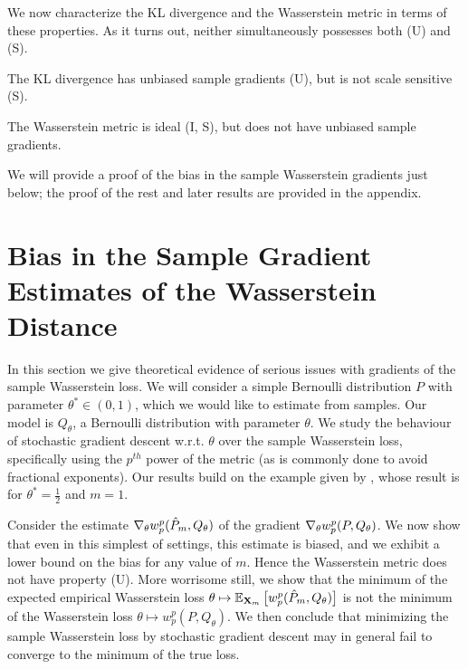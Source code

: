 \documentclass{article}
\def \wass {w}
\def \Qtheta {Q_\theta}
\def \batch {\mathbf{X}_m}
\begin{document}
We now characterize the KL divergence and the Wasserstein metric in terms of these properties. As it turns out, neither simultaneously possesses both (U) and (S).

\begin{prop}\label{prop:kl_prop}
The KL divergence has unbiased sample gradients (U), but is not scale sensitive (S).
\end{prop}
\begin{prop}\label{prop:wasserstein_prop}
The Wasserstein metric is ideal (I, S), but does not have unbiased sample gradients.
\end{prop}
We will provide a proof of the bias in the sample Wasserstein gradients just below; the proof of the rest and later results are provided in the appendix.

%

\section{Bias in the Sample Gradient Estimates of the Wasserstein Distance}

%
%

In this section we give theoretical evidence of serious issues with gradients of the sample Wasserstein loss. We will consider a simple Bernoulli distribution $P$ with parameter $\theta^*\in (0,1)$, which we would like to estimate from samples. Our model is $\Qtheta$, a Bernoulli distribution with parameter $\theta$. We study the behaviour of stochastic gradient descent w.r.t. $\theta$ over the sample Wasserstein loss, specifically using the $p^{th}$ power of the metric (as is commonly done to avoid fractional exponents).
Our results build on the example given by \citet{bellemare17distributional}, whose result is for $\theta^* = \tfrac{1}{2}$ and $m=1$.

%

%
%
%
%
%
%
%
%
%
%
%
%
%
%
%
%
%

%


Consider the estimate $\grad_\theta \wass^p_p(\hat P_m, Q_\theta)$ of the gradient $\grad_\theta \wass^p_p(P, Q_\theta)$.
%
We now show that even in this simplest of settings, this estimate is biased, and we exhibit a lower bound on the bias for any value of $m$.
Hence the Wasserstein metric does not have property (U). 
More worrisome still, we show that the minimum of the expected empirical Wasserstein loss $\theta\mapsto \expects_{\batch} \big[ \wass^p_p(\hat P_m, Q_\theta)\big]$ is not the minimum of the Wasserstein loss $\theta\mapsto \wass^p_p(P, Q_\theta)$.
We then conclude that minimizing the sample Wasserstein loss by stochastic gradient descent may in general fail to converge to the minimum of the true loss.
%
\end{document}

